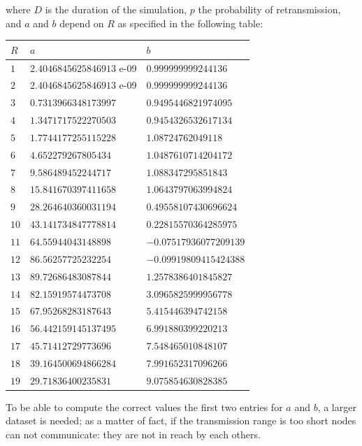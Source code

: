 where $D$ is the duration of the simulation, $p$ the probability of
retransmission, and $a$ and $b$ depend on $R$ as specified in the following
table:
\begin{center}
\begin{tabular}{ | m{1cm} | m{5cm}| m{5cm} | }
\hline
$R$&$a$&$b$\\
\hline
$1$&$2.4046845625846913$ e-09&$0.999999999244136$\\
\hline
$2$&$2.4046845625846913$ e-09&$0.999999999244136$\\
\hline
$3$&$0.7313966348173997$&$0.9495446821974095$\\
\hline
$4$&$1.3471717522270503$&$0.9454326532617134$\\
\hline
$5$&$1.7744177255115228$&$1.08724762049118$\\
\hline
$6$&$4.652279267805434$&$1.0487610714204172$\\
\hline
$7$&$9.586489452244717$&$1.088347295851843$\\
\hline
$8$&$15.841670397411658$&$1.0643797063994824$\\
\hline
$9$&$28.264640360031194$&$0.49558107430696624$\\
\hline
$10$&$43.141734847778814$&$0.22815570364285975$\\
\hline
$11$&$64.55944043148898$&$-0.07517936077209139$\\
\hline
$12$&$86.56257725232254$&$-0.09919809415424388$\\
\hline
$13$&$89.72686483087844$&$1.2578386401845827$\\
\hline
$14$&$82.15919574473708$&$3.0965825999956778$\\
\hline
$15$&$67.95268283187643$&$5.415446394742158$\\
\hline
$16$&$56.442159145137495$&$6.991880399220213$\\
\hline
$17$&$45.71412729773696$&$7.548465010848107$\\
\hline
$18$&$39.164500694866284$&$7.991652317096266$\\
\hline
$19$&$29.71836400235831$&$9.075854630828385$\\
\hline
\end{tabular}
\end{center}
To be able to compute the correct values the first two entries for $a$ and $b$,
a larger dataset is needed; as a matter of fact, if the transmission range is
too short nodes can not communicate: they are not in reach by each others.\\
